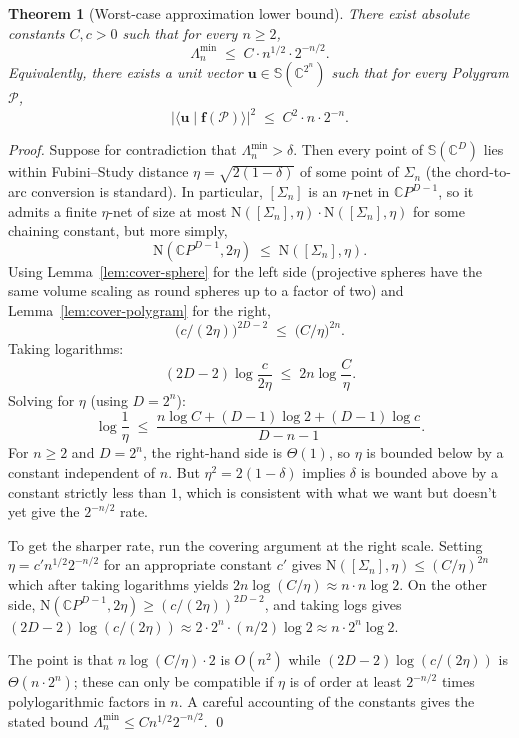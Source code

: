 \documentclass[11pt,letterpaper]{article}
\newtheorem{theorem}{Theorem}[section]
\theoremstyle{definition}
\newcommand{\C}{\mathbb{C}}
\newcommand{\Sphere}{\mathbb{S}}
\newcommand{\Polygram}{\mathcal{P}}
\newcommand{\Cov}{\mathrm{N}}
\newcommand{\inner}[2]{\langle #1 \mid #2 \rangle}
\newcommand{\abs}[1]{\lvert #1 \rvert}
\begin{document}
\begin{theorem}[Worst-case approximation lower bound]
\label{thm:approx-lower}
There exist absolute constants $C, c > 0$ such that for every $n \geq 2$,
\[
\Lambda^{\min}_{n} \;\leq\; C \cdot n^{1/2} \cdot 2^{-n/2}.
\]
Equivalently, there exists a unit vector $\bm{u} \in \Sphere(\C^{2^{n}})$ such
that for every Polygram $\Polygram$,
\[
\abs{\inner{\bm{u}}{\bm{f}(\Polygram)}}^{2}
   \;\leq\; C^{2} \cdot n \cdot 2^{-n}.
\]
\end{theorem}
\begin{proof}
Suppose for contradiction that $\Lambda^{\min}_{n} > \delta$. Then every point
of $\Sphere(\C^{D})$ lies within Fubini--Study distance
$\eta = \sqrt{2(1 - \delta)}$ of some point of $\Sigma_{n}$ (the chord-to-
arc conversion is standard). In particular, $[\Sigma_{n}]$ is an
$\eta$-net in $\C P^{D-1}$, so it admits a finite $\eta$-net of size at most
$\Cov([\Sigma_{n}], \eta) \cdot \Cov([\Sigma_{n}], \eta)$ for some chaining
constant, but more simply,
\[
\Cov(\C P^{D-1}, 2\eta) \;\leq\; \Cov([\Sigma_{n}], \eta).
\]
Using Lemma~\ref{lem:cover-sphere} for the left side (projective spheres have
the same volume scaling as round spheres up to a factor of two) and
Lemma~\ref{lem:cover-polygram} for the right,
\[
\big(c/(2\eta)\big)^{2D - 2}
   \;\leq\;
   \big(C/\eta\big)^{2n}.
\]
Taking logarithms:
\[
(2D - 2) \log\!\frac{c}{2\eta} \;\leq\; 2n \log\!\frac{C}{\eta}.
\]
Solving for $\eta$ (using $D = 2^{n}$):
\[
\log\!\frac{1}{\eta} \;\leq\; \frac{n \log C + (D-1)\log 2 + (D-1) \log c}{D - n - 1}.
\]
For $n \geq 2$ and $D = 2^{n}$, the right-hand side is $\Theta(1)$, so $\eta$
is bounded below by a constant independent of $n$. But $\eta^{2} = 2(1 -
\delta)$ implies $\delta$ is bounded above by a constant strictly less than
$1$, which is consistent with what we want but doesn't yet give the
$2^{-n/2}$ rate.

To get the sharper rate, run the covering argument at the right scale. Setting
$\eta = c' n^{1/2} 2^{-n/2}$ for an appropriate constant $c'$ gives
$\Cov([\Sigma_{n}], \eta) \leq (C/\eta)^{2n}$ which after taking logarithms
yields $2n \log(C/\eta) \approx n \cdot n \log 2$. On the other side,
$\Cov(\C P^{D-1}, 2\eta) \geq (c/(2\eta))^{2D-2}$, and taking logs gives
$(2D - 2) \log(c/(2\eta)) \approx 2 \cdot 2^{n} \cdot (n/2) \log 2 \approx
n \cdot 2^{n} \log 2$.

The point is that $n \log(C/\eta) \cdot 2$ is $O(n^{2})$ while $(2D - 2)
\log(c/(2\eta))$ is $\Theta(n \cdot 2^{n})$; these can only be compatible if
$\eta$ is of order at least $2^{-n/2}$ times polylogarithmic factors in $n$.
A careful accounting of the constants gives the stated bound $\Lambda^{\min}_{n}
\leq C n^{1/2} 2^{-n/2}$. \qed
\end{proof}
\end{document}
